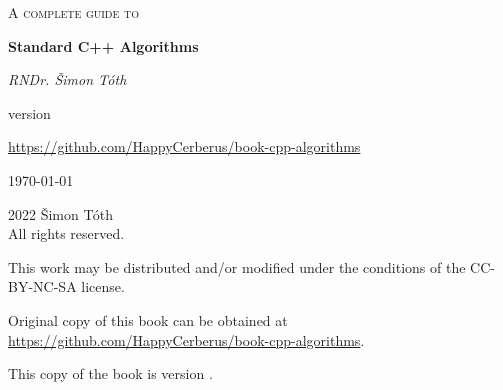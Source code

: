 \begin{titlepage}
	\centering
	\vspace{2cm}
	{\scshape\huge A complete guide to\par}
	\vspace{1.5cm}
	{\huge\bfseries Standard C++ Algorithms\par}
	\vspace{2cm}
	{\Large\itshape RNDr. Šimon Tóth\par}
	\vfill
	version \version\par
	\href{https://github.com/HappyCerberus/book-cpp-algorithms}{https://github.com/HappyCerberus/book-cpp-algorithms}

	\vfill

	{\large \today\par}
\end{titlepage}

\pagestyle{empty}
\begingroup
\footnotesize
\parindent 0pt
\parskip \baselineskip
\vfill
\textcopyright{} 2022 Šimon Tóth \\
All rights reserved.

This work may be distributed and/or modified under the conditions of the CC-BY-NC-SA license.

Original copy of this book can be obtained at \href{https://github.com/HappyCerberus/book-cpp-algorithms}{https://github.com/HappyCerberus/book-cpp-algorithms}.

This copy of the book is version \version.

\vfill

\vspace*{2\baselineskip}


\endgroup
\clearpage
\pagestyle{plain}